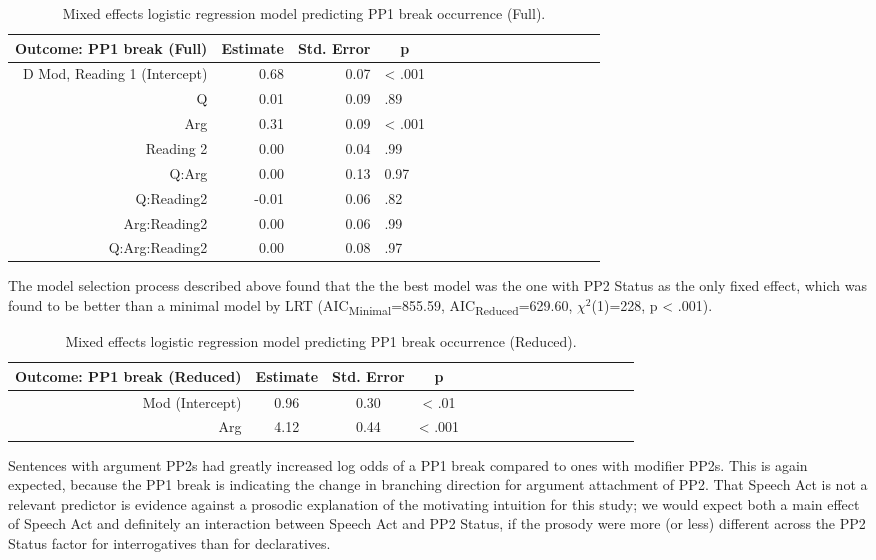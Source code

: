\documentclass[11pt,oneside]{book}
\begin{document}
\begin{table}[!h]

\caption{\label{tab:fullpp1Mod}Mixed effects logistic regression model predicting PP1 break occurrence (Full).}
\centering
\begin{tabular}{rrrlrrrlrrrlrrrl}
\toprule
\multicolumn{1}{c}{Outcome: PP1 break (Full)} & \multicolumn{1}{c}{Estimate} & \multicolumn{1}{c}{Std. Error} & \multicolumn{1}{c}{p}\\
\midrule
D Mod, Reading 1 (Intercept) & 0.68 & 0.07 & < .001\\
Q & 0.01 & 0.09 & .89\\
Arg & 0.31 & 0.09 & < .001\\
Reading 2 & 0.00 & 0.04 & .99\\
Q:Arg & 0.00 & 0.13 & 0.97\\
\addlinespace
Q:Reading2 & -0.01 & 0.06 & .82\\
Arg:Reading2 & 0.00 & 0.06 & .99\\
Q:Arg:Reading2 & 0.00 & 0.08 & .97\\
\bottomrule
\end{tabular}
\end{table}

The model selection process described above found that the the best model was the one with PP2 Status as the only fixed effect, which was found to be better than a minimal model by LRT (AIC\textsubscript{Minimal}=855.59, AIC\textsubscript{Reduced}=629.60, \(\chi^2\)(1)=228, p \textless{} .001).

\begin{table}[!h]

\caption{\label{tab:pp1Mod}Mixed effects logistic regression model predicting PP1 break occurrence (Reduced).}
\centering
\begin{tabular}{rcccrcccrcccrccc}
\toprule
\multicolumn{1}{c}{Outcome: PP1 break (Reduced)} & \multicolumn{1}{c}{Estimate} & \multicolumn{1}{c}{Std. Error} & \multicolumn{1}{c}{p}\\
\midrule
Mod (Intercept) & 0.96 & 0.30 & < .01\\
Arg & 4.12 & 0.44 & < .001\\
\bottomrule
\end{tabular}
\end{table}

Sentences with argument PP2s had greatly increased log odds of a PP1 break compared to ones with modifier PP2s. This is again expected, because the PP1 break is indicating the change in branching direction for argument attachment of PP2. That Speech Act is not a relevant predictor is evidence against a prosodic explanation of the motivating intuition for this study; we would expect both a main effect of Speech Act and definitely an interaction between Speech Act and PP2 Status, if the prosody were more (or less) different across the PP2 Status factor for interrogatives than for declaratives.
\end{document}

